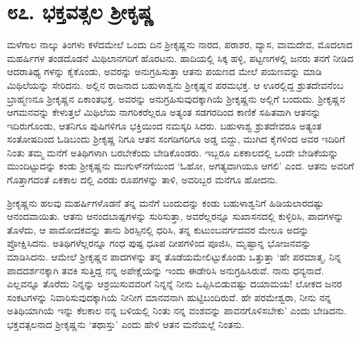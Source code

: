 
\chapter{೮೭. ಭಕ್ತವತ್ಸಲ ಶ್ರೀಕೃಷ್ಣ}

ಮಳೆಗಾಲ ನಾಲ್ಕು ತಿಂಗಳು ಕಳೆದಮೇಲೆ ಒಂದು ದಿನ ಶ್ರೀಕೃಷ್ಣನು ನಾರದ, ಪರಾಶರ, ವ್ಯಾಸ, ವಾಮದೇವ, ಮೊದಲಾದ ಮಹರ್ಷಿಗಳ ತಂಡದೊಡನೆ ಮಿಥಿಲಾನಗರಿಗೆ ಹೊರಟನು. ಹಾದಿಯಲ್ಲಿ ಸಿಕ್ಕ ಹಳ್ಳಿ, ಪಟ್ಟಣಗಳಲ್ಲಿ ಜನರು ತನಗೆ ನೀಡಿದ ಆದರಾತಿಥ್ಯ ಗಳನ್ನು ಕೈಕೊಂಡು, ಅವರನ್ನು ಅನುಗ್ರಹಿಸುತ್ತಾ ಆತನು ಪಯಣದ ಮೇಲೆ ಪಯಣವನ್ನು ಮಾಡಿ ಮಿಥಿಲೆಯನ್ನು ಸೇರಿದನು. ಅಲ್ಲಿನ ರಾಜನಾದ ಬಹುಳಾಶ್ವನು ಶ್ರೀಕೃಷ್ಣನ ಪರಮಭಕ್ತ. ಆ ಊರಲ್ಲಿದ್ದ ಶ್ರುತದೇವನೆಂಬ ಬ್ರಾಹ್ಮಣನೂ ಶ್ರೀಕೃಷ್ಣನ ಏಕಾಂತಭಕ್ತ. ಅವರನ್ನು ಅನುಗ್ರಹಿಸುವುದಕ್ಕಾಗಿಯೆ ಶ್ರೀಕೃಷ್ಣನು ಅಲ್ಲಿಗೆ ಬಂದುದು. ಶ್ರೀಕೃಷ್ಣನ ಆಗಮನವನ್ನು ಕೇಳುತ್ತಲೆ ಮಿಥಿಲೆಯ ನಾಗರಿಕರೆಲ್ಲರೂ ಅತ್ಯಂತ ಸಡಗರದಿಂದ ಕಾಣಿಕೆ ಸಹಿತವಾಗಿ ಆತನನ್ನು ಇದಿರುಗೊಂಡು, ಆತನಿಗೂ ಪುಷಿಗಳಿಗೂ ಭಕ್ತಿಯಿಂದ ನಮಸ್ಕರಿ ಸಿದರು. ಬಹುಳಾಶ್ವ ಶ್ರುತದೇವರೂ ಅತ್ಯಂತ ಸಂತೋಷದಿಂದ ಓಡಿಬಂದು ಶ್ರೀಕೃಷ್ಣ ನಿಗೂ ಆತನ ಸಂಗಡಿಗರಿಗೂ ಅಡ್ಡ ಬಿದ್ದು, ಮುಗಿದ ಕೈಗಳಿಂದ ಅವರ ಇದಿರಿಗೆ ನಿಂತು ತಮ್ಮ ಮನೆಗೆ ಅತಿಥಿಗಳಾಗಿ ಬರಬೇಕೆಂದು ಬೇಡಿಕೊಂಡರು. ಇಬ್ಬರೂ ಏಕಕಾಲದಲ್ಲಿ ಒಂದೇ ಬೇಡಿಕೆಯನ್ನು ಮುಂದಿಟ್ಟುದನ್ನು ಕಂಡು ಶ್ರೀಕೃಷ್ಣನು ಮುಗುಳ್​ನಗೆಯಿಂದ ‘ಓಹೋ, ಅಗತ್ಯವಾಗಿಯೂ ಆಗಲಿ’ ಎಂದ. ಆತನು ಅವರಿಗೆ ಗೊತ್ತಾಗದಂತೆ ಏಕಕಾಲ ದಲ್ಲಿ ಎರಡು ರೂಪಗಳನ್ನು ತಾಳಿ, ಅವರಿಬ್ಬರ ಮನೆಗೂ ಹೋದನು.

ಶ್ರೀಕೃಷ್ಣನು ಹಲವು ಮಹರ್ಷಿಗಳೊಡನೆ ತನ್ನ ಮನೆಗೆ ಬಂದುದನ್ನು ಕಂಡು ಬಹುಳಾಶ್ವನಿಗೆ ಹಿಡಿಯಲಾರದಷ್ಟು ಆನಂದವಾಯಿತು. ಆತನು ಆನಂದಬಾಷ್ಪಗಳನ್ನು ಸುರಿಸುತ್ತಾ, ಅವರೆಲ್ಲರನ್ನೂ ಸುಖಾಸನದಲ್ಲಿ ಕುಳ್ಳಿರಿಸಿ, ಪಾದಗಳನ್ನು ತೊಳೆದು, ಆ ಪಾದೋದಕವನ್ನು ತಾನು ಶಿರಸ್ಸಿನಲ್ಲಿ ಧರಿಸಿ, ತನ್ನ ಕುಟುಂಬವರ್ಗದವರ ಮೇಲೂ ಅದನ್ನು ಪ್ರೋಕ್ಷಿಸಿದನು. ಅತಿಥಿಗಳೆಲ್ಲರನ್ನೂ ಗಂಧ ಪುಷ್ಪ ಧೂಪ ದೀಪಗಳಿಂದ ಪೂಜಿಸಿ, ಮೃಷ್ಟಾನ್ನ ಭೋಜನವನ್ನು ಮಾಡಿಸಿದನು. ಆಮೇಲೆ ಶ್ರೀಕೃಷ್ಣನ ಪಾದಗಳನ್ನು ತನ್ನ ತೊಡೆಯಮೇಲಿಟ್ಟುಕೊಂಡು ಒತ್ತುತ್ತಾ ‘ಹೇ ಪರಮಾತ್ಮ, ನಿನ್ನ ಪಾದದರ್ಶನಕ್ಕಾಗಿ ತವಕಿ ಸುತ್ತಿದ್ದ ನನ್ನ ಅಪೇಕ್ಷೆಯನ್ನು ಇಂದು ಈಡೇರಿಸಿ ಅನುಗ್ರಹಿಸಿರುವೆ. ನಾನು ಧನ್ಯನಾದೆ. ಎಲ್ಲವನ್ನೂ ತೊರೆದು ನಿನ್ನನ್ನು ಆಶ್ರಯಿಸುವವರಿಗೆ ನಿನ್ನನ್ನೆ ನೀನು ಒಪ್ಪಿಸಿಬಿಡುವಷ್ಟು ದಯಾಮಯ! ಲೋಕದ ಜನರ ಸಂಕಟಗಳನ್ನು ನಿವಾರಿಸುವುದಕ್ಕಾಗಿಯೆ ನೀನೀಗ ಮಾನವನಾಗಿ ಹುಟ್ಟಿಬಂದಿರುವೆ. ಹೇ ಪರಮೇಶ್ವರಾ, ನೀನು ನನ್ನ ಅತಿಥಿಯಾಗಿಯೆ ಇನ್ನು ಕೆಲಕಾಲ ನನ್ನ ಬಳಿಯಲ್ಲಿ ನಿಂತು ನನ್ನ ವಂಶವನ್ನು ಪಾವನಗೊಳಿಸಬೇಕು’ ಎಂದು ಬೇಡಿದನು. ಭಕ್ತವತ್ಸಲನಾದ ಶ್ರೀಕೃಷ್ಣನು ‘ತಥಾಸ್ತು’ ಎಂದು ಹೇಳಿ ಆತನ ಮನೆಯಲ್ಲೆ ನಿಂತನು.

